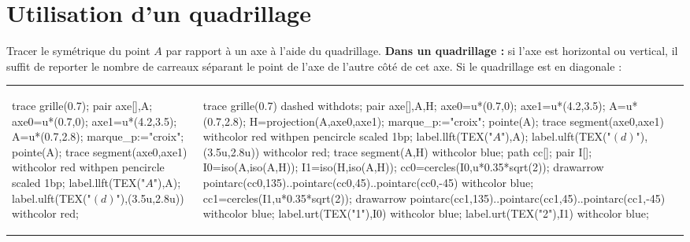 \section{Utilisation d'un quadrillage}    
    \begin{methode*1}
      Tracer le symétrique du point $A$ par rapport à un axe à l'aide du quadrillage.
       \exercice
         {\bf Dans un quadrillage :} si l'axe est horizontal ou vertical, il suffit de reporter le nombre de carreaux séparant le point de l'axe de l'autre côté de cet axe. Si le quadrillage est en diagonale : 
         
         \medskip
         \begin{tabular}{>{\centering\arraybackslash}p{50mm}>{\centering\arraybackslash}p{50mm}>{\centering\arraybackslash}p{50mm}}   
         \begin{Geometrie}[CoinHD={(4.21u,3.51u)}]                        
            trace grille(0.7);
            pair axe[],A;
            axe0=u*(0.7,0);
            axe1=u*(4.2,3.5);
            A=u*(0.7,2.8);
            marque_p:="croix";
            pointe(A);
            trace segment(axe0,axe1) withcolor red withpen pencircle scaled 1bp;
            label.llft(TEX("$A$"),A);
            label.ulft(TEX("$(d)$"),(3.5u,2.8u)) withcolor red;
         \end{Geometrie}
            &
         \begin{Geometrie}[CoinHD={(4.21u,3.51u)}]                        
            trace grille(0.7) dashed withdots;
            pair axe[],A,H;
            axe0=u*(0.7,0);
            axe1=u*(4.2,3.5);
            A=u*(0.7,2.8);
            H=projection(A,axe0,axe1);
            marque_p:="croix";
            pointe(A);
            trace segment(axe0,axe1) withcolor red withpen pencircle scaled 1bp;
            label.llft(TEX("$A$"),A);
            label.ulft(TEX("$(d)$"),(3.5u,2.8u)) withcolor red;
            trace segment(A,H) withcolor blue;
            path cc[];
            pair I[];
            I0=iso(A,iso(A,H));
            I1=iso(H,iso(A,H));
            cc0=cercles(I0,u*0.35*sqrt(2));            
            drawarrow pointarc(cc0,135)..pointarc(cc0,45)..pointarc(cc0,-45) withcolor blue;
            cc1=cercles(I1,u*0.35*sqrt(2));            
            drawarrow pointarc(cc1,135)..pointarc(cc1,45)..pointarc(cc1,-45) withcolor blue;
            label.urt(TEX("\num{1}"),I0) withcolor blue;
            label.urt(TEX("\num{2}"),I1) withcolor blue;
         \end{Geometrie}

\end{tabular}
\end{methode*1}
